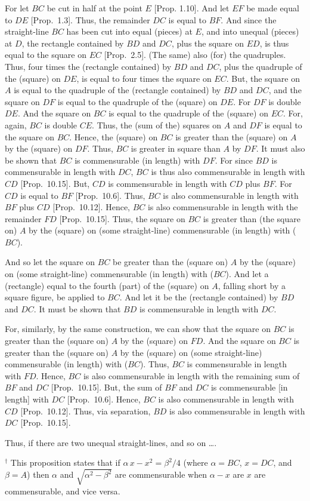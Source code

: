 \begin{Parallel}{}{}
{For let $BC$ be cut in  half at the point $E$ [Prop. 1.10]. And let $EF$ be made equal to
$DE$ [Prop.~1.3]. Thus, the remainder $DC$
is equal to $BF$. And since the straight-line $BC$ has been cut into equal
(pieces) at $E$, and into unequal (pieces) at $D$, the rectangle contained by
$BD$ and $DC$, plus the square on $ED$, is thus equal to the square on $EC$ [Prop.~2.5]. (The same) also (for) the quadruples.  
Thus, four times the (rectangle contained) by $BD$ and $DC$, plus
the quadruple of the (square) on $DE$, is equal to four times the square on 
$EC$. But, the square on $A$ is equal to the quadruple of the (rectangle
contained) by $BD$ and $DC$, and the square on $DF$ is equal to
the quadruple of the (square) on $DE$. For $DF$ is double $DE$. 
And the square on  $BC$ is equal to the quadruple of the (square) on $EC$.
For, again, $BC$ is double $CE$. Thus, the (sum of the) squares on $A$ and
$DF$ is equal to the square on $BC$. Hence, the (square) on $BC$
is greater than the (square) on $A$ by the (square) on $DF$. Thus,
$BC$ is greater in square than $A$ by $DF$. It must also be shown that $BC$
is commensurable (in length) with $DF$. For since $BD$ is commensurable in length
with $DC$, $BC$ is thus also commensurable in length with $CD$ [Prop.~10.15]. 
But, $CD$ is commensurable in length with $CD$ plus $BF$. For $CD$ is equal
to $BF$ [Prop.~10.6].  Thus, $BC$ is also commensurable in length with $BF$ plus $CD$
[Prop.~10.12]. Hence, $BC$ is also commensurable
in length with the remainder $FD$ [Prop.~10.15]. Thus, the square on $BC$ is
greater than (the square on) $A$ by the (square) on (some straight-line)
commensurable (in length) with ($BC$).

And so let the square on $BC$ be greater than the (square on) $A$ by the
(square) on (some straight-line) commensurable (in length) with ($BC$). And let
a (rectangle) equal to the fourth (part) of the (square) on $A$, falling
short by a square figure, be applied to $BC$. And let it be
the (rectangle contained) by $BD$ and $DC$. It must be shown that $BD$
is commensurable in length with $DC$.

For, similarly, by the same construction, we can  show that the
square on $BC$ is greater than the (square on) $A$ by the (square) on $FD$.
And the square on $BC$ is greater than the (square on) $A$ by the
(square) on (some straight-line) commensurable (in length) with ($BC$).  Thus, $BC$ is
commensurable in length with $FD$. Hence, $BC$ is also commensurable in length with the remaining sum of $BF$ and $DC$ [Prop.~10.15]. But, the sum of $BF$ and $DC$
is commensurable [in length] with $DC$ [Prop.~10.6]. Hence, $BC$ is also
commensurable in length with $CD$ [Prop.~10.12]. 
Thus, via separation, $BD$ is also commensurable in length with $DC$ [Prop.~10.15].

Thus,  if there are two unequal straight-lines, and so on \ldots.}
\end{Parallel}
{\footnotesize\noindent$^\dag$ This proposition states that if $\alpha\,x-x^2=\beta^2/4$ (where $\alpha=BC$, $x=DC$,
and $\beta=A$) then $\alpha$ and $\sqrt{\alpha^2-\beta^2}$ are commensurable when $\alpha-x$ are $x$ are commensurable, and {\rm vice versa}.}

